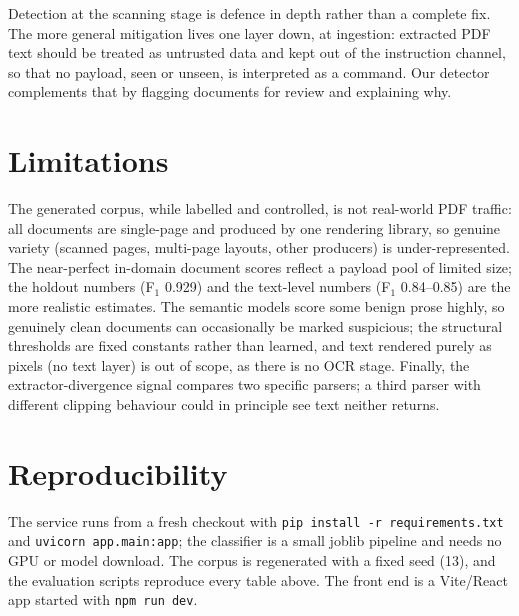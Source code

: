 \documentclass[11pt]{article}
\begin{document}
Detection at the scanning stage is defence in depth rather than a complete fix.
The more general mitigation lives one layer down, at ingestion: extracted PDF
text should be treated as untrusted data and kept out of the instruction
channel, so that no payload, seen or unseen, is interpreted as a command. Our
detector complements that by flagging documents for review and explaining why.

\section*{Limitations}

The generated corpus, while labelled and controlled, is not real-world PDF
traffic: all documents are single-page and produced by one rendering library,
so genuine variety (scanned pages, multi-page layouts, other producers) is
under-represented. The near-perfect in-domain document scores reflect a payload
pool of limited size; the holdout numbers (F$_1$ 0.929) and the text-level
numbers (F$_1$ 0.84--0.85) are the more realistic estimates. The
semantic models score some benign prose highly, so genuinely clean documents can
occasionally be marked suspicious; the structural thresholds are fixed constants
rather than learned, and text rendered purely as pixels (no text layer) is out of
scope, as there is no OCR stage. Finally, the extractor-divergence signal
compares two specific parsers; a third parser with different clipping behaviour
could in principle see text neither returns.



\appendix

\section{Reproducibility}
\label{sec:appendix}

The service runs from a fresh checkout with \texttt{pip install -r
requirements.txt} and \texttt{uvicorn app.main:app}; the classifier is a small
joblib pipeline and needs no GPU or model download. The corpus is
regenerated with a fixed seed (13), and the evaluation scripts reproduce every
table above. The front end is a Vite/React app started with \texttt{npm run
dev}.
\end{document}

